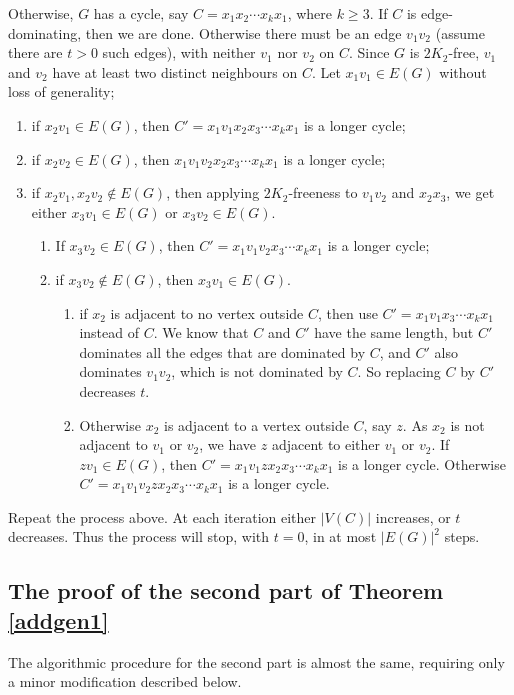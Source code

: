 \documentclass{ws-jktr}
\newcommand{\qed}{\prbox}
\begin{document}
Otherwise, $G$ has a cycle, say $C=x_1x_2\cdots x_kx_1$, where $k\ge3$.
If $C$ is edge-dominating, then we are done.
Otherwise
there must be an edge $v_1v_2$ (assume there are $t>0$ such edges),
with neither $v_1$ nor $v_2$ on $C$.
Since $G$ is $2K_2$-free, $v_1$ and $v_2$ have at least two distinct neighbours on $C$.
Let $x_1v_1\in E(G)$ without loss of generality;
\begin{enumerate}
\item if $x_2v_1\in E(G)$, then $C'=x_1v_1x_2x_3\cdots x_kx_1$ is a longer cycle;
\item if $x_2v_2\in E(G)$, then $x_1v_1v_2x_2x_3\cdots x_kx_1$ is a longer cycle;
\item if $x_2v_1,x_2v_2\not\in E(G)$, then applying $2K_2$-freeness to $v_1v_2$ and $x_2x_3$,
we get either $x_3v_1\in E(G)$ or $x_3v_2\in E(G)$.
\begin{enumerate}
\item If $x_3v_2\in E(G)$, then $C'=x_1v_1v_2x_3\cdots x_kx_1$ is a longer cycle;
\item if $x_3v_2\not\in E(G)$, then $x_3v_1\in E(G)$.
\begin{enumerate}
\item if $x_2$ is adjacent to no vertex outside $C$, then use $C'=x_1v_1x_3\cdots x_kx_1$ instead of $C$.
We know that $C$ and $C'$ have the same length, but $C'$ dominates all the edges that
are dominated by $C$, and $C'$ also dominates $v_1v_2$, which is not dominated by $C$. So replacing $C$ by $C'$
decreases $t$.
\item Otherwise $x_2$ is adjacent to a vertex outside $C$, say $z$.
As $x_2$ is not adjacent to $v_1$ or $v_2$, we have $z$ adjacent to either $v_1$ or $v_2$. If $zv_1\in E(G)$, then $C'=x_1v_1zx_2x_3\cdots x_kx_1$ is a longer cycle.
Otherwise $C'=x_1v_1v_2zx_2x_3\cdots x_kx_1$ is a longer cycle.
\end{enumerate}
\end{enumerate}
\end{enumerate}
Repeat the process above. At each iteration either $|V(C)|$ increases, or $t$ decreases.
Thus the process will stop, with $t=0$, in at most $|E(G)|^2$ steps.
\qed

\subsection{The proof of the second part of Theorem  \ref{addgen1}}
The algorithmic procedure for the second part is almost the same, requiring only a minor
modification described below.
\end{document}
